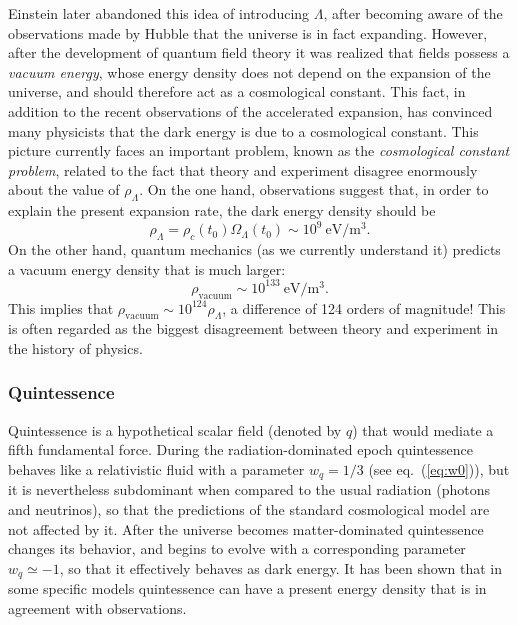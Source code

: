 Einstein later abandoned this idea of introducing $\Lambda$, after becoming aware of the observations made by Hubble that the universe is in fact expanding. However, after the development of quantum field theory it was realized that fields possess a {\it vacuum energy}, whose energy density does not depend on the expansion of the universe, and should therefore act as a cosmological constant. This fact, in addition to the recent observations of the accelerated expansion, has convinced many physicists that the dark energy is due to a cosmological constant. This picture currently faces an important problem, known as the {\it cosmological constant problem}, related to the fact that theory and experiment disagree enormously about the value of $\rho_{\Lambda}$. On the one hand, observations suggest that, in order to explain the present expansion rate, the dark energy density should be
\begin{equation}
\rho_{\Lambda}=\rho_c(t_0)\Omega_{\Lambda}(t_0)\sim 10^9~\mathrm{eV/m^3}.
\end{equation}
On the other hand, quantum mechanics (as we currently understand it) predicts a vacuum energy density that is much larger:
\begin{equation}
\rho_{\mathrm{vacuum}}\sim 10^{133}~\mathrm{eV/m^3}.
\end{equation}
This implies that $\rho_{\mathrm{vacuum}}\sim 10^{124}\rho_{\Lambda}$, a difference of 124 orders of magnitude! This is often regarded as the biggest disagreement between theory and experiment in the history of physics.

\subsubsection{Quintessence}

Quintessence is a hypothetical scalar field (denoted by $q$) that would mediate a fifth fundamental force. During the radiation-dominated epoch quintessence behaves like a relativistic fluid with a parameter $w_q=1/3$ (see eq.\ (\ref{eq:w0})), but it is nevertheless subdominant when compared to the usual radiation (photons and neutrinos), so that the predictions of the standard cosmological model are not affected by it. After the universe becomes matter-dominated quintessence changes its behavior, and begins to evolve with a corresponding parameter $w_q\simeq -1$, so that it effectively behaves as dark energy. It has been shown that in some specific models quintessence can have a present energy density that is in agreement with observations.

